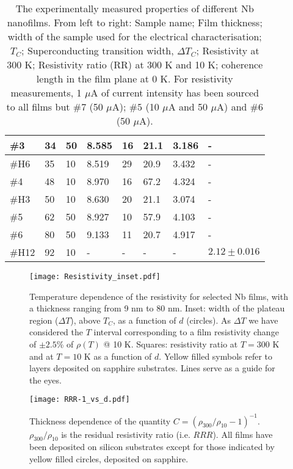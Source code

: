 \documentclass[reprint,onecolumn,superscriptaddress,a4paper,nofootinbib,floatfix]{revtex4-1}
\begin{document}
\begin{table}[h]
\begin{tabular}{|l|l|l|l|l|l|l|l|}
  \hline
 {\#3}   &  {34}   &  {50}  &  {8.585}  & {16}  &  {21.1}  &  {3.186}  &  {-}\\
 \hline
 {\#H6}   &  {35}   &  {10}  &  {8.519}  & {29}  &  {20.9}  &  {3.432}  &  {-}\\
 \hline
 {\#4}   &  {48}   &  {10}  & {8.970}  & {16}  &  {67.2}  &  {4.324}  &  {-}\\
 \hline
 {\#H3}   &  {50}  &  {10}  &  {8.630}  & {20}  &  {21.1}  &  {3.074}  &  {-}\\
 \hline
 {\#5}   &  {62}  &  {50}  & {8.927}  & {10} &  {57.9}  &  {4.103}  &  {-}\\
 \hline
 {\#6}   &  {80}  &  {50}  &  {9.133}  & {11}  &  {20.7}  &  {4.917}  & {-}\\ 
  \hline
 {\#H12}   &  {92}  &  {10}  &  {-}  & {-}  &  {-}  &  {-}  & {$2.12\pm0.016$}\\ 
 \hline
 \end{tabular}
\caption{The experimentally measured properties of different Nb nanofilms. From left to right: Sample name; Film thickness; width of the sample used for the electrical characterisation; $T_C$; Superconducting transition width, $\Delta T_C$; Resistivity at 300 K; Resistivity ratio (RR) at 300 K and 10 K; coherence length in the film plane at 0 K. For resistivity measurements, 1 $\mu$A of current intensity has been sourced to all films but $\#7$ (50 $\mu$A); $\#5$ (10 $\mu$A and 50 $\mu$A) and 
$\#6$ (50 $\mu$A).}
 \label{Table}
\end{table}



\begin{figure}[ht]
\centering
\texttt{[image: Resistivity\_inset.pdf]}
\caption{Temperature dependence of the resistivity for selected Nb films, with a thickness ranging from 9 nm to 80 nm. Inset: width of the plateau region ($\Delta T$), above $T_C$, as a function of $d$ (circles). As $\Delta T$ we have considered the $T$ interval corresponding to a film resistivity change of $\pm 2.5$\% of $\rho(T)$ @ 10 K. Squares: resistivity ratio at $T = 300$ K and at $T = 10$ K as a function of $d$. Yellow filled symbols refer to layers deposited on sapphire substrates. Lines serve as a guide for the eyes.}  
\label{FigRT}
\end{figure}

\begin{figure}[h]
\centering
\texttt{[image: RRR-1\_vs\_d.pdf]}
\caption{Thickness dependence of the quantity $C = (\rho_{300}/\rho_{10}-1)^{-1}$. $\rho_{300}/\rho_{10}$ is the residual resistivity ratio (i.e. $RRR$). All films have been deposited on silicon substrates except for those indicated by yellow filled circles, deposited on sapphire. } 
\label{RRR}
\end{figure}
\end{document}
